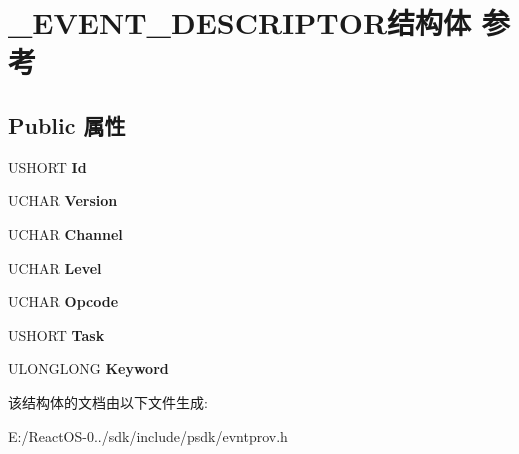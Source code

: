 \hypertarget{struct___e_v_e_n_t___d_e_s_c_r_i_p_t_o_r}{}\section{\+\_\+\+E\+V\+E\+N\+T\+\_\+\+D\+E\+S\+C\+R\+I\+P\+T\+O\+R结构体 参考}
\label{struct___e_v_e_n_t___d_e_s_c_r_i_p_t_o_r}
\subsection*{Public 属性}
\begin{DoxyCompactItemize}
\item 
\mbox{\label{struct___e_v_e_n_t___d_e_s_c_r_i_p_t_o_r_afe241abeaa2e094e81ebdbe57f9497b1}} 
U\+S\+H\+O\+RT {\bfseries Id}
\item 
\mbox{\label{struct___e_v_e_n_t___d_e_s_c_r_i_p_t_o_r_a67e5c9c74c3d881a1fda13f0393967f5}} 
U\+C\+H\+AR {\bfseries Version}
\item 
\mbox{\label{struct___e_v_e_n_t___d_e_s_c_r_i_p_t_o_r_a2828d898d3409f7b82514537d1196725}} 
U\+C\+H\+AR {\bfseries Channel}
\item 
\mbox{\label{struct___e_v_e_n_t___d_e_s_c_r_i_p_t_o_r_a88a4ffa0fe15e292a9a68b8dd6c9bcd5}} 
U\+C\+H\+AR {\bfseries Level}
\item 
\mbox{\label{struct___e_v_e_n_t___d_e_s_c_r_i_p_t_o_r_a6145166cd58e0454597a2654444dfb8d}} 
U\+C\+H\+AR {\bfseries Opcode}
\item 
\mbox{\label{struct___e_v_e_n_t___d_e_s_c_r_i_p_t_o_r_a140d48edf2c50ccfd6d55e4cb4c2773a}} 
U\+S\+H\+O\+RT {\bfseries Task}
\item 
\mbox{\label{struct___e_v_e_n_t___d_e_s_c_r_i_p_t_o_r_a4338490b0434b822935905e499d8b1b4}} 
U\+L\+O\+N\+G\+L\+O\+NG {\bfseries Keyword}
\end{DoxyCompactItemize}


该结构体的文档由以下文件生成\+:\begin{DoxyCompactItemize}
\item 
E\+:/\+React\+O\+S-\/0../sdk/include/psdk/evntprov.\+h\end{DoxyCompactItemize}
